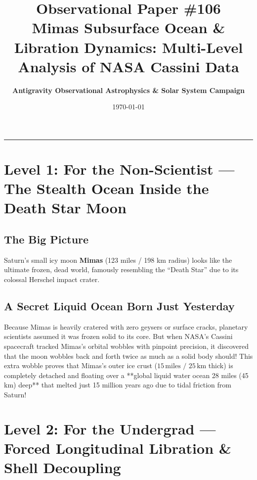 \documentclass[11pt,a4paper]{article}
\title{\Huge \textbf{Observational Paper \#106}\\ \Large Mimas Subsurface Ocean \& Libration Dynamics: Multi-Level Analysis of NASA Cassini Data}
\author{\textbf{Antigravity Observational Astrophysics \& Solar System Campaign}}
\date{\today}
\begin{document}
\maketitle

\vspace{-1em}
\begin{center}
\rule{\textwidth}{1.5pt}
\end{center}

\section*{Level 1: For the Non-Scientist — The Stealth Ocean Inside the Death Star Moon}

\subsection*{The Big Picture}
Saturn's small icy moon \textbf{Mimas} (123 miles / 198 km radius) looks like the ultimate frozen, dead world, famously resembling the ``Death Star'' due to its colossal Herschel impact crater.

\subsection*{A Secret Liquid Ocean Born Just Yesterday}
Because Mimas is heavily cratered with zero geysers or surface cracks, planetary scientists assumed it was frozen solid to its core. But when NASA's Cassini spacecraft tracked Mimas's orbital wobbles with pinpoint precision, it discovered that the moon wobbles back and forth twice as much as a solid body should! This extra wobble proves that Mimas's outer ice crust ($15\,\text{miles / }25\,\text{km}$ thick) is completely detached and floating over a **global liquid water ocean 28 miles (45 km) deep** that melted just 15 million years ago due to tidal friction from Saturn!

\newpage

\section*{Level 2: For the Undergrad — Forced Longitudinal Libration \& Shell Decoupling}
\end{document}
